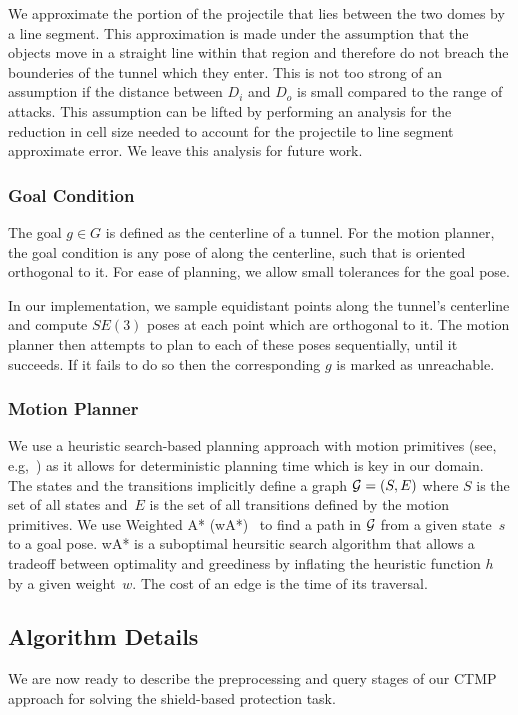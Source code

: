 \documentclass[a4paper]{report}
\begin{document}
We approximate the portion of the projectile that lies between the two domes by a line segment. This approximation is made under the assumption that the objects move in a straight line within that region and therefore do not breach the bounderies of the tunnel which they enter. This is not too strong of an assumption if the distance between $D_i$ and $D_o$ is small compared to the range of attacks.
This assumption can be lifted by performing an analysis for the reduction in cell size needed to account for the projectile to line segment approximate error. We leave this analysis for future work.
%

\subsubsection{Goal Condition}
The goal $g \in G$ is defined as the centerline of a tunnel. For the motion planner, the goal condition is any pose of \calS along the centerline, such that \calS is oriented orthogonal to it. For ease of planning, we allow small tolerances for the goal pose.

In our implementation, we sample equidistant points along the tunnel's centerline and compute $SE(3)$ poses at each point which are orthogonal to it. The motion planner then attempts to plan to each of these poses sequentially, until it succeeds. If it fails to do so then the corresponding $g$ is marked as unreachable.
 
\subsubsection{Motion Planner}
We use a heuristic search-based planning approach with motion primitives (see, e.g,~\cite{CCL10,CSCL11,LF09})
as it allows for deterministic planning time which is key in our domain.
The states and the transitions implicitly define a graph $\mathcal{G} = (S,E)$ where $S$ is the set of all states and~$E$ is the set of all transitions defined by the motion primitives. We use Weighted A* (wA*)~\cite{pohl1970heuristic} to find a path in $\mathcal{G}$ from a given state~$s$ to a goal pose. 
wA* is a suboptimal heursitic search algorithm that allows a tradeoff between optimality and greediness by inflating the heuristic function $h$ by a given weight~$w$. The cost of an edge is the time of its traversal.

\subsection{Algorithm Details}
We are now ready to describe the preprocessing and query stages of our CTMP approach for solving the shield-based protection task.
\end{document}
